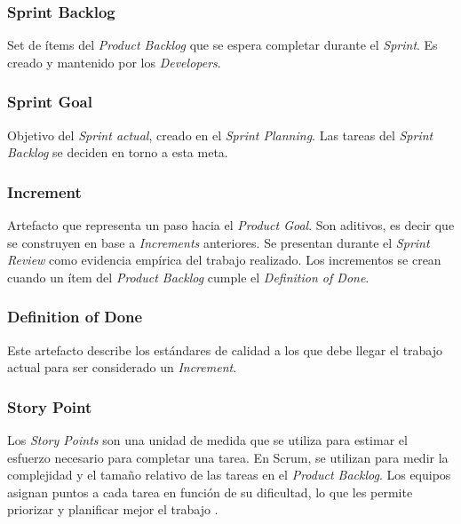 \subsubsection{Sprint Backlog}
\par Set de ítems del \emph{Product Backlog} que se espera completar durante el \emph{Sprint}. Es creado y mantenido por los \emph{Developers}.
%
\subsubsection{Sprint Goal}
Objetivo del \emph{Sprint actual}, creado en el \emph{Sprint Planning}. Las tareas del \emph{Sprint Backlog} se deciden en torno a esta meta.
%
\subsubsection{Increment}
\par Artefacto que representa un paso hacia el \emph{Product Goal}. Son aditivos, es decir que se construyen en base a \emph{Increments} anteriores. Se presentan durante el \emph{Sprint Review} como evidencia empírica del trabajo realizado. Los incrementos se crean cuando un ítem del \emph{Product Backlog} cumple el \emph{Definition of Done}.
%
\subsubsection{Definition of Done}
Este artefacto describe los estándares de calidad a los que debe llegar el trabajo actual para ser considerado un \emph{Increment}.
%
\subsubsection{Story Point}
\par Los \emph{Story Points} son una unidad de medida que se utiliza para estimar el esfuerzo necesario para completar una tarea. En Scrum, se utilizan para medir la complejidad y el tamaño relativo de las tareas en el \emph{Product Backlog}. Los equipos asignan puntos a cada tarea en función de su dificultad, lo que les permite priorizar y planificar mejor el trabajo \cite{montegalianoImplantarScrumCon2016,canosaferreiroSCRUMTeoriaImplementacion2024}. 
%
